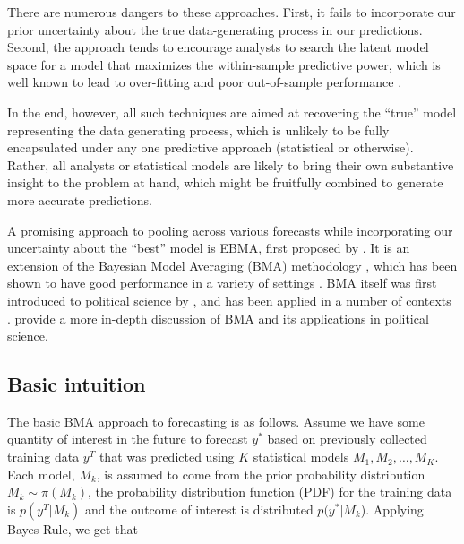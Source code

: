 \documentclass[pdftex,12pt,fullpage,oneside]{amsart}
\begin{document}
There are numerous dangers to these approaches. First, it fails
to incorporate our prior uncertainty about the true
data-generating process in our predictions. Second, the approach tends
to encourage analysts to search the latent model space for a model
that maximizes the within-sample predictive power, which is well known
to lead to over-fitting and poor out-of-sample performance
\citep{Hastie:2001}.

In the end, however, all such techniques are aimed at recovering the
``true'' model representing the data generating process, which is
unlikely to be fully encapsulated under any one predictive approach
(statistical or otherwise). Rather, all analysts or statistical models
are likely to bring their own substantive insight to the problem at
hand, which might be fruitfully combined to generate more accurate
predictions.
 

A promising approach to pooling across various forecasts while
incorporating our uncertainty about the ``best'' model is EBMA, first
proposed by \citet{Raftery:2005}. It is an extension of the Bayesian
Model Averaging (BMA) methodology \citep[c.f.,][]{Madigan:1994,
  Draper:1995, Raftery:1995, Hoeting:1999, Clyde:2003, Clyde:2004},
which has been shown to have good performance in a variety of settings
\citep{Raftery:2003}. BMA itself was first introduced to political
science by \citet{Bartels:1997}, and has been applied in a number of
contexts \citep[e.g.,][]{Bartels:2001, Gill:2004, Zaller:2004,
  Imai:2004, Geer:2006b}. \citet{Montgomery:2010c} provide a more
in-depth discussion of BMA and its applications in political science.

\subsection{Basic intuition}

The basic BMA approach to forecasting is as follows. Assume we have
some quantity of interest in the future to forecast $y^*$ based on
previously collected training data $y^T$ that was predicted using $K$
statistical models $M_1, M_2, \ldots, M_K$. Each model, $M_k$, is
assumed to come from the prior probability distribution $M_k\sim
\pi(M_k)$, the probability distribution function (PDF) for the
training data is $p(y^T|M_k)$ and the outcome of interest is
distributed $p(y^*|M_k$).  Applying Bayes Rule, we get that
\end{document}
